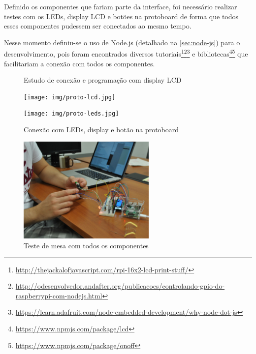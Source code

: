 \documentclass[
		12pt,				%
		openright,			%
		oneside,			%
		a4paper,			%
		chapter=TITLE,		%
		english,			%
		brazil				%
	]{abntex2}
\begin{document}
Definido os componentes que fariam parte da interface, foi necessário realizar testes com os LEDs, display LCD e botões na protoboard de forma que todos esses componentes pudessem ser conectados ao mesmo tempo. 

Nesse momento definiu-se o uso de Node.js (detalhado na \autoref{sec:node-js}) para o desenvolvimento, pois foram encontrados diversos tutoriais\footnote{\url{http://thejackalofjavascript.com/rpi-16x2-lcd-print-stuff/}}\footnote{\url{http://odesenvolvedor.andafter.org/publicacoes/controlando-gpio-do-raspberrypi-com-nodejs.html}}\footnote{\url{https://learn.adafruit.com/node-embedded-development/why-node-dot-js}} e bibliotecas\footnote{\url{https://www.npmjs.com/package/lcd}}\footnote{\url{https://www.npmjs.com/package/onoff}} que facilitariam a conexão com todos os componentes.

\begin{figure}[htb]
	\centering
 	\begin{minipage}{0.47\textwidth}
		\centering
		\caption{\label{fig:proto-lcd}Estudo de conexão e programação com display LCD}
		\texttt{[image: img/proto-lcd.jpg]}
	\end{minipage}
	\hfill
	\begin{minipage}{0.47\textwidth}
		\centering
		\caption{\label{fig:proto-leds}Conexão com LEDs, display e botão na protoboard}
		\texttt{[image: img/proto-leds.jpg]}
	\end{minipage}
\end{figure}

\begin{figure}[htb]
	\caption{\label{fig:proto-total}Teste de mesa com todos os componentes}
	\begin{center}
		\includegraphics[width=0.6\textwidth]{img/proto-total.jpg}
	\end{center}
\end{figure}
\end{document}
